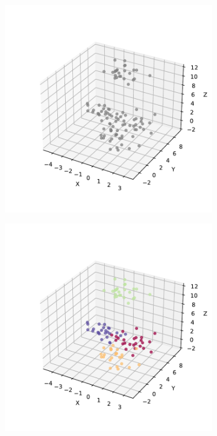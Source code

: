 \begin{figure}[h]
  \centering
  \begin{subfigure}{0.45\textwidth}
    \centering
    \includegraphics[width=\textwidth]{figures/artificial-data.pdf}
    \caption{}
    \label{fig:artificial-data-grey}
  \end{subfigure}
  \begin{subfigure}{0.45\textwidth}
    \centering
    \includegraphics[width=\textwidth]{figures/artificial-data-labeled.pdf}

\end{subfigure}
\end{figure}
